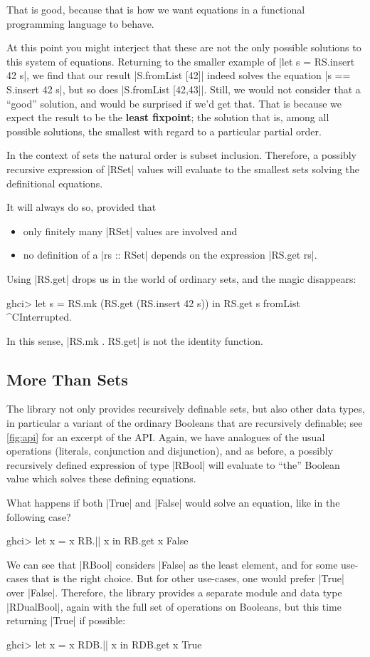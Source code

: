 \documentclass[manuscript,screen,acmsmall,nonacm]{acmart}
\begin{document}
That is good, because that is how we want equations in a functional programming language to behave.

At this point you might interject that these are not the only possible solutions to this system of equations. Returning to the smaller example of |let s = RS.insert 42 s|, we find that our result |S.fromList [42]| indeed solves the equation |s == S.insert 42 s|, but so does |S.fromList [42,43]|. Still, we would not consider that a “good” solution, and would be surprised if we'd get that.
%
That is because we expect the result to be the \textbf{least fixpoint}; the solution that is, among all possible solutions, the smallest with regard to a particular partial order.

In the context of sets the natural order is subset inclusion. Therefore, a possibly recursive expression of |RSet| values will evaluate to the smallest sets solving the definitional equations.

It will always do so, provided that
\begin{itemize}
\item only finitely many |RSet| values are involved and
\item no definition of a |rs :: RSet| depends on the expression |RS.get rs|.
\end{itemize}
Using |RS.get| drops us in the world of ordinary sets, and the magic disappears:
\begin{code}
ghci> let s = RS.mk (RS.get (RS.insert 42 s)) in RS.get s
fromList ^CInterrupted.
\end{code}
In this sense, |RS.mk . RS.get| is not the identity function.

\subsection{More Than Sets}

The library not only provides recursively definable sets, but also other data types, in particular a variant of the ordinary Booleans that are recursively definable; see \cref{fig:api} for an excerpt of the API. Again, we have analogues of the usual operations (literals, conjunction and disjunction), and as before, a possibly recursively defined expression of type |RBool| will evaluate to “the” Boolean value which solves these defining equations.

What happens if both |True| and |False| would solve an equation, like in the following case?
\begin{code}
ghci> let x = x RB.|| x in RB.get x
False
\end{code}
We can see that |RBool| considers |False| as the least element, and for some use-cases that is the right choice. But for other use-cases, one would prefer |True| over |False|. Therefore, the library provides a separate module and data type |RDualBool|, again with the full set of operations on Booleans, but this time returning |True| if possible:
\begin{code}
ghci> let x = x RDB.|| x in RDB.get x
True
\end{code}
\end{document}
